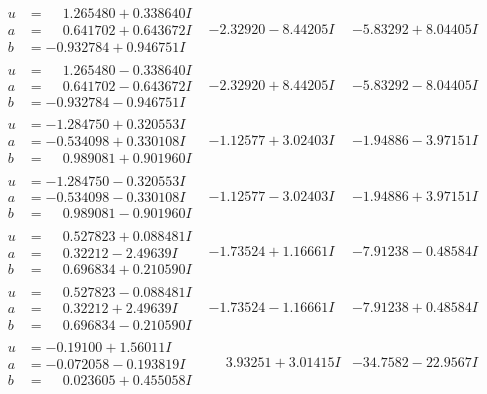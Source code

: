 \documentclass[1p]{elsarticle_modified}
\theoremstyle{definition}
\begin{document}
$$\begin{array}{c|c|c}
\begin{aligned}
u &= \phantom{-}1.265480 + 0.338640 I \\
a &= \phantom{-}0.641702 + 0.643672 I \\
b &= -0.932784 + 0.946751 I\end{aligned}
 & -2.32920 - 8.44205 I & -5.83292 + 8.04405 I \\ \hline\begin{aligned}
u &= \phantom{-}1.265480 - 0.338640 I \\
a &= \phantom{-}0.641702 - 0.643672 I \\
b &= -0.932784 - 0.946751 I\end{aligned}
 & -2.32920 + 8.44205 I & -5.83292 - 8.04405 I \\ \hline\begin{aligned}
u &= -1.284750 + 0.320553 I \\
a &= -0.534098 + 0.330108 I \\
b &= \phantom{-}0.989081 + 0.901960 I\end{aligned}
 & -1.12577 + 3.02403 I & -1.94886 - 3.97151 I \\ \hline\begin{aligned}
u &= -1.284750 - 0.320553 I \\
a &= -0.534098 - 0.330108 I \\
b &= \phantom{-}0.989081 - 0.901960 I\end{aligned}
 & -1.12577 - 3.02403 I & -1.94886 + 3.97151 I \\ \hline\begin{aligned}
u &= \phantom{-}0.527823 + 0.088481 I \\
a &= \phantom{-}0.32212 - 2.49639 I \\
b &= \phantom{-}0.696834 + 0.210590 I\end{aligned}
 & -1.73524 + 1.16661 I & -7.91238 - 0.48584 I \\ \hline\begin{aligned}
u &= \phantom{-}0.527823 - 0.088481 I \\
a &= \phantom{-}0.32212 + 2.49639 I \\
b &= \phantom{-}0.696834 - 0.210590 I\end{aligned}
 & -1.73524 - 1.16661 I & -7.91238 + 0.48584 I \\ \hline\begin{aligned}
u &= -0.19100 + 1.56011 I \\
a &= -0.072058 - 0.193819 I \\
b &= \phantom{-}0.023605 + 0.455058 I\end{aligned}
 & \phantom{-}3.93251 + 3.01415 I & -34.7582 - 22.9567 I \\ \hline\begin{aligned}

\end{aligned}
\end{array}$$
\end{document}
